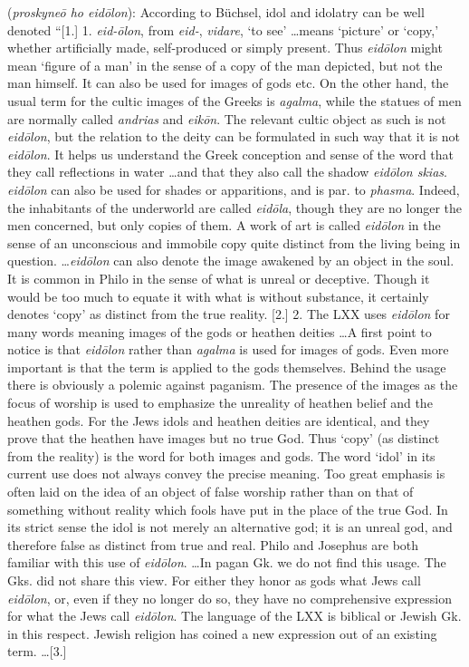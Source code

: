 \item[Idol worship,]

(\textit{proskyneō ho eidōlon}):
According to Büchsel, idol and idolatry can be well denoted ``[1.] 1. \emph{eid-ōlon}, from \emph{eid-}, \emph{vidare}, `to see' \ldots means `picture' or `copy,' whether artificially made, self-produced or simply present. Thus \emph{eidōlon} might mean `figure of a man' in the sense of a copy of the man depicted, but not the man himself. It can also be used for images of gods etc. On the other hand, the usual term for the cultic images of the Greeks is \emph{agalma}, while the statues of men are normally called \emph{andrias} and \emph{eikōn}. The relevant cultic object as such is not \emph{eidōlon}, but the relation to the deity can be formulated in such way that it is  not \emph{eidōlon}. It helps us understand the Greek conception and sense of the word that they call reflections in water \ldots and that they also call the shadow \emph{eidōlon skias}. \emph{eidōlon} can also be used for shades or apparitions, and is par. to \emph{phasma}. Indeed, the inhabitants of the underworld are called \emph{eidōla}, though they are no longer the men concerned, but only copies of them. A work of art is called \emph{eidōlon} in the sense of an unconscious and immobile copy quite distinct from the living being in question. \ldots \emph{eidōlon} can also denote the image awakened by an object in the soul. It is common in Philo in the sense of what is unreal or deceptive. Though it would be too much to equate it with what is without substance, it certainly denotes `copy' as distinct from the true reality. [2.] 2. The LXX uses \emph{eidōlon} for many words meaning images of the gods or heathen deities \ldots A first point to notice is that \emph{eidōlon} rather than \emph{agalma} is used for images of gods. Even more important is that the term is applied to the gods themselves. Behind the usage there is obviously a polemic against paganism. The presence of the images as the focus of worship is used to emphasize the unreality of heathen belief and the heathen gods. For the Jews idols and heathen deities are identical, and they prove that the heathen have images but no true God. Thus `copy' (as distinct from the reality) is the word for both images and gods. The word `idol' in its current use does not always convey the precise meaning. Too great emphasis is often laid on the idea of an object of false worship rather than on that of something without reality which fools have put in the place of the true God. In its strict sense the idol is not merely an alternative god; it is an unreal god, and therefore false as distinct from true and real. Philo and Josephus are both familiar with this use of \emph{eidōlon}. \ldots In pagan Gk. we do not find this usage. The Gks. did not share this view. For either they honor as gods what Jews call \emph{eidōlon}, or, even if they no longer do so, they have no comprehensive expression for what the Jews call \emph{eidōlon}. The language of the LXX is biblical or Jewish Gk. in this respect. Jewish religion has coined a new expression out of an existing term. \ldots [3.] 